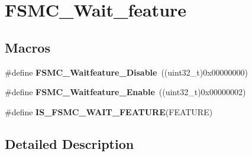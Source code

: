 \hypertarget{group___f_s_m_c___wait__feature}{\section{F\-S\-M\-C\-\_\-\-Wait\-\_\-feature}
\label{group___f_s_m_c___wait__feature}
}
\subsection*{Macros}
\begin{DoxyCompactItemize}
\item 
\hypertarget{group___f_s_m_c___wait__feature_ga8a31f05576e66546fbbcdb06ff67da7d}{\#define {\bfseries F\-S\-M\-C\-\_\-\-Waitfeature\-\_\-\-Disable}~((uint32\-\_\-t)0x00000000)}\label{group___f_s_m_c___wait__feature_ga8a31f05576e66546fbbcdb06ff67da7d}

\item 
\hypertarget{group___f_s_m_c___wait__feature_ga3113366130dfbf6d116f1afb94af1726}{\#define {\bfseries F\-S\-M\-C\-\_\-\-Waitfeature\-\_\-\-Enable}~((uint32\-\_\-t)0x00000002)}\label{group___f_s_m_c___wait__feature_ga3113366130dfbf6d116f1afb94af1726}

\item 
\#define {\bfseries I\-S\-\_\-\-F\-S\-M\-C\-\_\-\-W\-A\-I\-T\-\_\-\-F\-E\-A\-T\-U\-R\-E}(F\-E\-A\-T\-U\-R\-E)
\end{DoxyCompactItemize}


\subsection{Detailed Description}


